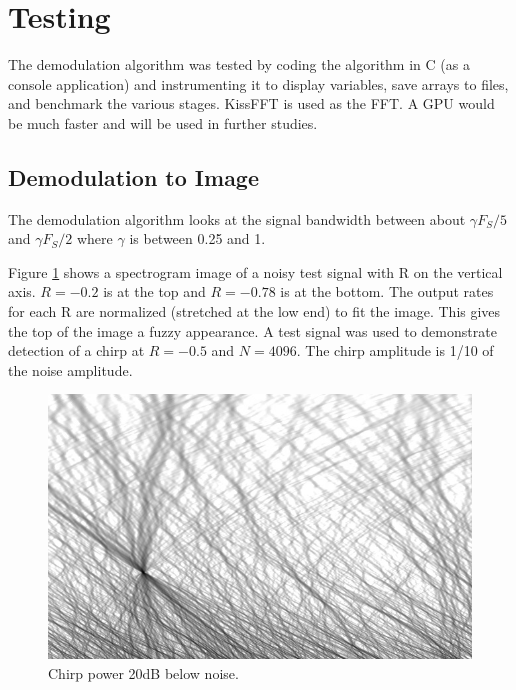 \section{Testing}

The demodulation algorithm was tested by coding the algorithm in C (as a console
application) and instrumenting it to display variables,
save arrays to files, and benchmark the various stages.
KissFFT is used as the FFT.
A GPU would be much faster and will be used in further studies.

\subsection{Demodulation to Image}

The demodulation algorithm looks at the signal bandwidth between about
$\gamma F_S/5$ and $\gamma F_S/2$ where $\gamma$ is between 0.25 and 1.

Figure \ref{fig:chirpTest1} shows a spectrogram image of a noisy test signal
with R on the vertical axis.
$R=-0.2$ is at the top and $R=-0.78$ is at the bottom.
The output rates for each R are normalized (stretched at the low end)
to fit the image.
This gives the top of the image a fuzzy appearance.
A test signal was used to demonstrate detection of a chirp at
$R=-0.5$ and $N=4096$.
The chirp amplitude is 1/10 of the noise amplitude.
\begin{figure}
  \includegraphics[width=\linewidth]{../source/chirp42m.jpg}
  \caption{Chirp power 20dB below noise.}
  \label{fig:chirpTest1}
\end{figure}

